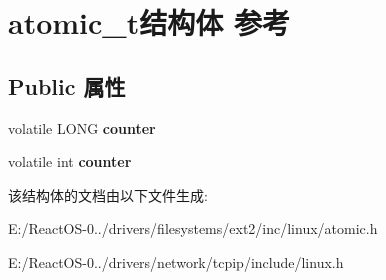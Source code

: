 \hypertarget{structatomic__t}{}\section{atomic\+\_\+t结构体 参考}
\label{structatomic__t}
\subsection*{Public 属性}
\begin{DoxyCompactItemize}
\item 
\mbox{\label{structatomic__t_a70860001f8ce5958e9bd06aa98df06a7}} 
volatile L\+O\+NG {\bfseries counter}
\item 
\mbox{\label{structatomic__t_a020ccc869804eafc5ef2e62c3cf63a36}} 
volatile int {\bfseries counter}
\end{DoxyCompactItemize}


该结构体的文档由以下文件生成\+:\begin{DoxyCompactItemize}
\item 
E\+:/\+React\+O\+S-\/0../drivers/filesystems/ext2/inc/linux/atomic.\+h\item 
E\+:/\+React\+O\+S-\/0../drivers/network/tcpip/include/linux.\+h\end{DoxyCompactItemize}

